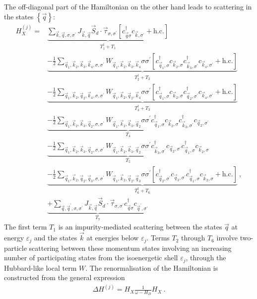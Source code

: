 \documentclass{revtex4-2}
\begin{document}
The off-diagonal part of the Hamiltonian on the other hand leads to scattering in the states \(\left\{ \vec q \right\} \):
\begin{equation}\begin{aligned}
	H_X^{(j)} =& \underbrace{\sum_{\vec k, \vec q, \sigma,\sigma^\prime}J_{\vec k, \vec q} \vec{S}_d\cdot\vec{\tau}_{\sigma,\sigma^\prime}\left[c^\dagger_{\vec q\sigma}c_{\vec k,\sigma^\prime} + \text{h.c.}\right]}_{T_1^\dagger + T_1} \\
		   &\underbrace{- \frac{1}{2}\sum_{\vec q_1,\vec k_2, \vec k_3, \vec k_4,\sigma,\sigma^\prime}W_{\vec q_1,\vec k_2,\vec k_3,\vec k_4} \sigma\sigma^\prime \left[c^\dagger_{\vec q_1,\sigma}c_{\vec k_2,\sigma}c^\dagger_{\vec k_3,\sigma^\prime}c_{\vec k_4,\sigma^\prime} + \text{h.c.}\right]}_{T_2^\dagger + T_2}\\
		   &\underbrace{- \frac{1}{2}\sum_{\vec q_1,\vec k_2, \vec q_2, \vec k_4,\sigma,\sigma^\prime}W_{\vec q_1,\vec k_2, \vec q_2, \vec k_4} \sigma\sigma^\prime \left[c^\dagger_{\vec q_1,\sigma}c_{\vec k_2,\sigma}c^\dagger_{\vec q_2,\sigma^\prime}c_{\vec k_4,\sigma^\prime} + \text{h.c.}\right]}_{T_3^\dagger + T_3}\\
		   &\underbrace{- \frac{1}{2}\sum_{\vec q_1,\vec k_2,\vec k_3,\vec q_2,\sigma,\sigma^\prime}W_{\vec q_1,\vec k_2,\vec k_3,\vec q_2} \sigma\sigma^\prime c^\dagger_{\vec q_1,\sigma}c_{\vec k_2,\sigma}c^\dagger_{\vec k_3,\sigma^\prime}c_{\vec q_2,\sigma^\prime}}_{T_4}\\
		   &\underbrace{- \frac{1}{2}\sum_{\vec q_1,\vec k_2,\vec k_3,\vec q_2,\sigma,\sigma^\prime}W_{\vec q_1,\vec k_2,\vec k_3,\vec q_2} \sigma\sigma^\prime c^\dagger_{\vec k_3,\sigma^\prime}c_{\vec q_2,\sigma^\prime}c^\dagger_{\vec q_1,\sigma}c_{\vec k_2,\sigma}}_{T_5}\\
		   &\underbrace{- \frac{1}{2}\sum_{\vec q_1,\vec k_2, \vec q_2, \vec q_3,\sigma,\sigma^\prime}W_{\vec q_1,\vec k_2, \vec q_2, \vec q_3} \sigma\sigma^\prime \left[c^\dagger_{\vec q_2,\sigma^\prime}c_{\vec q_3,\sigma^\prime}c^\dagger_{\vec q_1,\sigma}c_{\vec k_2,\sigma} + \text{h.c.}\right]}_{T_6^\dagger + T_6}~,\\
		   &\underbrace{+\sum_{\vec q, \vec q^\prime, \sigma,\sigma^\prime}J_{\vec k, \vec q} \vec{S}_d\cdot\vec{\tau}_{\sigma,\sigma^\prime}c^\dagger_{\vec q\sigma}c_{\vec q^\prime,\sigma^\prime}}_{T_7}
\end{aligned}\end{equation}
The first term \(T_1\) is an impurity-mediated scattering between the states \(\vec q\) at energy \(\varepsilon_j\) and the states \(\vec k\) at energies below \(\varepsilon_j\). Terms \(T_2\) through \(T_6\) involve two-particle scattering between these momentum states involving an increasing number of participating states from the isoenergetic shell \(\varepsilon_j\), through the Hubbard-like local term \(W\). The renormalisation of the Hamiltonian is constructed from the general expression
\begin{equation}\begin{aligned}
	\Delta H^{(j)} = H_X \frac{1}{\omega- H_D} H_X~.
\end{aligned}\end{equation}
\end{document}

